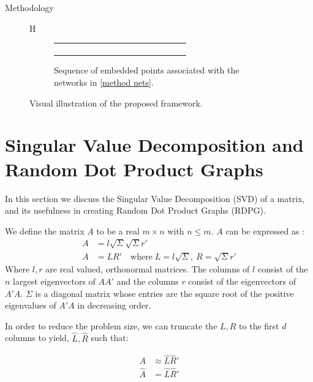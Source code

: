 \documentclass[12pt]{amsbook}
\begin{document}
\begin{chapter}{Methodology}
\begin{figure}{H}
\begin{subfigure}[c]{1\textwidth}
\begin{tabular}{llll}
\begin{subfigure}[c]{0.31\textwidth}
\begin{subfigure}[p]{1\textwidth}
                    \end{subfigure}
                \end{subfigure}
                
                \end{tabular}
                \caption{Sequence of embedded points associated with the networks in \cref{method nets}.}
                \label{method plots}
                
            \end{subfigure}

            \caption{Visual illustration of the proposed framework.}
            \label{framework illustration}
        \end{figure} 

    \section{Singular Value Decomposition and Random Dot Product Graphs}
            \label{svd}
            In this section we discuss the Singular Value Decomposition (SVD) of a matrix, and its usefulness in creating Random Dot Product Graphs (RDPG).

            We define the matrix $A$ to be a real $m \times n$ with $n \le m$. $A$ can be expressed as \cite{forsythe1967computer}:
            \begin{align}
                A&=l\sqrt{\Sigma} \sqrt{\Sigma} r' \\
                A&=L R' \quad \text{where} \; L=l\sqrt \Sigma,\: R=\sqrt \Sigma r'
            \end{align}
            Where $l, r$ are real valued, orthonormal matrices. The columns of $l$ consist of the $n$ largest eigenvectors of $AA'$ and the columns $r$ consist of the eigenvectors of $A'A$. $\Sigma$ is a diagonal matrix whose entries are the square root of the positive eigenvalues of $A'A$ in decreasing order.

            In order to reduce the problem size, we can truncate the $L,R$ to the first $d$ columns to yield, $\hat L, \hat R$ such that:

            \begin{align}
                A &\approx \hat L \hat R' \\
                \hat A &= \hat L \hat R'
                \label{approx}
            \end{align}



\end{chapter}
\end{document}
